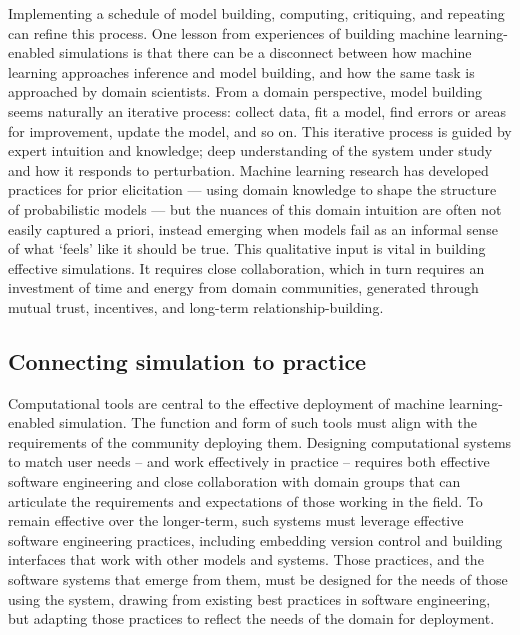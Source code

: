 Implementing a schedule of model building, computing, critiquing, and
repeating can refine this process. One lesson from experiences of
building machine learning-enabled simulations is that there can be a
disconnect between how machine learning approaches inference and model
building, and how the same task is approached by domain scientists. From
a domain perspective, model building seems naturally an iterative
process: collect data, fit a model, find errors or areas for
improvement, update the model, and so on. This iterative process is
guided by expert intuition and knowledge; deep understanding of the
system under study and how it responds to perturbation. Machine learning
research has developed practices for prior elicitation --- using domain
knowledge to shape the structure of probabilistic models --- but the
nuances of this domain intuition are often not easily captured a priori,
instead emerging when models fail as an informal sense of what `feels'
like it should be true. This qualitative input is vital in building
effective simulations. It requires close collaboration, which in turn
requires an investment of time and energy from domain communities,
generated through mutual trust, incentives, and long-term
relationship-building.

\subsection{Connecting simulation to
practice}\label{connecting-simulation-to-practice}

Computational tools are central to the effective deployment of machine
learning-enabled simulation. The function and form of such tools must
align with the requirements of the community deploying them. Designing
computational systems to match user needs -- and work effectively in
practice -- requires both effective software engineering and close
collaboration with domain groups that can articulate the requirements
and expectations of those working in the field. To remain effective over
the longer-term, such systems must leverage effective software
engineering practices, including embedding version control and building
interfaces that work with other models and systems. Those practices, and
the software systems that emerge from them, must be designed for the
needs of those using the system, drawing from existing best practices in
software engineering, but adapting those practices to reflect the needs
of the domain for deployment.

